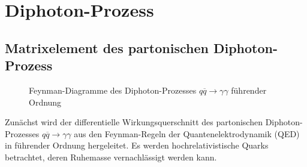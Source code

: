 \chapter{Diphoton-Prozess}
\label{2}
\section{Matrixelement des partonischen Diphoton-Prozess}
\begin{figure}
	\quad
	\caption{Feynman-Diagramme des Diphoton-Prozesses $q\overline{q} \rightarrow \gamma \gamma$ führender Ordnung}
	\label{feynman-diagramme}
\end{figure}
Zunächst wird der differentielle Wirkungsquerschnitt des partonischen Diphoton-Prozesses $q\overline{q} \rightarrow \gamma \gamma$ aus den Feynman-Regeln der Quantenelektrodynamik (QED) in führender Ordnung hergeleitet. Es werden hochrelativistische Quarks betrachtet, deren Ruhemasse vernachlässigt werden kann.

